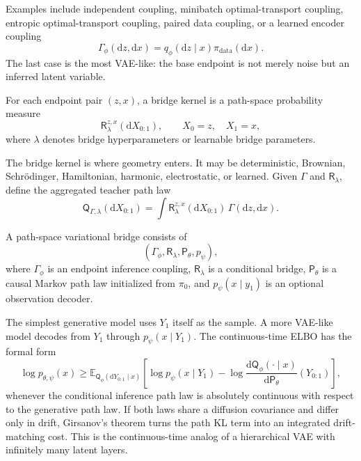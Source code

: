 \documentclass[twoside,11pt]{jmlr}
\numberwithin{equation}{section}
\newcommand{\E}{\mathbb{E}}
\newcommand{\dd}{\mathrm{d}}
\newcommand{\pdata}{\pi_{\mathrm{data}}}
\newcommand{\pbase}{\pi_0}
\newcommand{\scrR}{\mathsf{R}}
\newcommand{\scrP}{\mathsf{P}}
\newcommand{\scrQ}{\mathsf{Q}}
\begin{document}
Examples include independent coupling, minibatch optimal-transport coupling, entropic optimal-transport coupling, paired data coupling, or a learned encoder coupling
\begin{equation}
    \Gamma_\phi(\dd z,\dd x)=q_\phi(\dd z\mid x)\pdata(\dd x).
\end{equation}
The last case is the most VAE-like: the base endpoint is not merely noise but an inferred latent variable.

\begin{definition}
For each endpoint pair $(z,x)$, a bridge kernel is a path-space probability measure
\begin{equation}
    \scrR^{z,x}_\lambda(\dd X_{0:1}),
    \qquad X_0=z,\quad X_1=x,
\end{equation}
where $\lambda$ denotes bridge hyperparameters or learnable bridge parameters.
\end{definition}

The bridge kernel is where geometry enters. It may be deterministic, Brownian, Schr\"odinger, Hamiltonian, harmonic, electrostatic, or learned. Given $\Gamma$ and $\scrR_\lambda$, define the aggregated teacher path law
\begin{equation}
    \scrQ_{\Gamma,\lambda}(\dd X_{0:1})
    =\int \scrR^{z,x}_\lambda(\dd X_{0:1})\,\Gamma(\dd z,\dd x).
    \label{eq:teacher_path_law}
\end{equation}

\begin{definition}
A path-space variational bridge consists of
\begin{equation}
    (\Gamma_\phi,\scrR_\lambda,\scrP_\theta,p_\psi),
\end{equation}
where $\Gamma_\phi$ is an endpoint inference coupling, $\scrR_\lambda$ is a conditional bridge, $\scrP_\theta$ is a causal Markov path law initialized from $\pbase$, and $p_\psi(x\mid y_1)$ is an optional observation decoder.
\end{definition}

The simplest generative model uses $Y_1$ itself as the sample. A more VAE-like model decodes from $Y_1$ through $p_\psi(x\mid Y_1)$. The continuous-time ELBO has the formal form
\begin{equation}
    \log p_{\theta,\psi}(x)
    \ge
    \E_{\scrQ_\phi(\dd Y_{0:1}\mid x)}
    \left[
        \log p_\psi(x\mid Y_1)
        -\log\frac{\dd \scrQ_\phi(\cdot\mid x)}{\dd \scrP_\theta}(Y_{0:1})
    \right],
    \label{eq:path_elbo}
\end{equation}
whenever the conditional inference path law is absolutely continuous with respect to the generative path law. If both laws share a diffusion covariance and differ only in drift, Girsanov's theorem turns the path KL term into an integrated drift-matching cost. This is the continuous-time analog of a hierarchical VAE with infinitely many latent layers.
\end{document}
